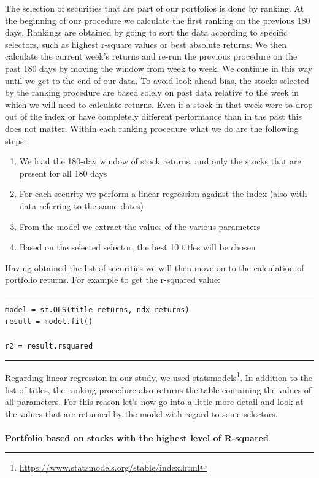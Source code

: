 \documentclass[twocolumn]{article}
\begin{document}
The selection of securities that are part of our portfolios is done by ranking. At the beginning of our procedure we calculate the first ranking on the previous 180 days. Rankings are obtained by going to sort the data according to specific selectors, such as highest r-square values or best absolute returns. We then calculate the current week's returns and re-run the previous procedure on the past 180 days by moving the window from week to week. We continue in this way until we get to the end of our data. To avoid look ahead bias, the stocks selected by the ranking procedure are based solely on past data relative to the week in which we will need to calculate returns. Even if a stock in that week were to drop out of the index or have completely different performance than in the past this does not matter. Within each ranking procedure what we do are the following steps:
\begin{enumerate}
\item We load the 180-day window of stock returns, and only the stocks that are present for all 180 days
\item For each security we perform a linear regression against the index (also with data referring to the same dates)
\item From the model we extract the values of the various parameters
\item Based on the selected selector, the best 10 titles will be chosen 
\end{enumerate}
Having obtained the list of securities we will then move on to the calculation of portfolio returns. For example to get the r-squared value:
\rule{\linewidth}{0.4pt}
\vspace{-5 mm}
\begin{verbatim}
model = sm.OLS(title_returns, ndx_returns)
result = model.fit()

r2 = result.rsquared
\end{verbatim}
\vspace{-3 mm}
\rule{\linewidth}{0.4pt}
Regarding linear regression in our study, we used statsmodels\footnote{\url{https://www.statsmodels.org/stable/index.html}}. In addition to the list of titles, the ranking procedure also returns the table containing the values of all parameters. For this reason let's now go into a little more detail and look at the values that are returned by the model with regard to some selectors.\\\\
\textbf{Portfolio based on stocks with the highest level of R-squared}\\
\end{document}
